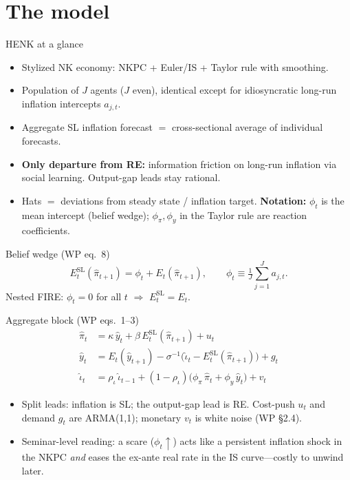 \documentclass[11pt,aspectratio=169]{beamer}
\newcommand{\Esl}{E_t^{\mathrm{SL}}}
\newcommand{\Ere}{E_t}
\begin{document}
\section{The model}
\begin{frame}{HENK at a glance}
  \begin{itemize}
    \item Stylized NK economy: NKPC + Euler/IS + Taylor rule with smoothing.
    \item Population of $J$ agents ($J$ even), identical except for idiosyncratic
          long-run inflation intercepts $a_{j,t}$.
    \item Aggregate SL inflation forecast $=$ cross-sectional average of
          individual forecasts.
    \item \textbf{Only departure from RE:} information friction on long-run
          inflation via social learning. Output-gap leads stay rational.
    \item Hats $=$ deviations from steady state / inflation target.
          \textbf{Notation:} $\phi_t$ is the mean intercept (belief wedge);
          $\phi_\pi,\phi_y$ in the Taylor rule are reaction coefficients.
  \end{itemize}
  \vfill
  \begin{block}{Belief wedge (WP eq.\ 8)}
    \[
      \Esl(\hat\pi_{t+1})
      = \phi_t + \Ere(\hat\pi_{t+1}),
      \qquad
      \phi_t \equiv \tfrac1J\sum_{j=1}^J a_{j,t}.
    \]
    Nested FIRE: $\phi_t=0$ for all $t$ $\Rightarrow$ $\Esl=\Ere$.
  \end{block}
\end{frame}

\begin{frame}{Aggregate block (WP eqs.\ 1--3)}
  \begin{align}
    \hat\pi_t
      &= \kappa\,\hat y_t
         + \beta\,\Esl(\hat\pi_{t+1})
         + u_t
      \tag{NKPC} \\[0.4em]
    \hat y_t
      &= \Ere(\hat y_{t+1})
         - \sigma^{-1}\bigl(
             \hat\iota_t - \Esl(\hat\pi_{t+1})
           \bigr)
         + g_t
      \tag{IS} \\[0.4em]
    \hat\iota_t
      &= \rho_\iota\,\hat\iota_{t-1}
         + (1-\rho_\iota)
           \bigl(\phi_\pi\,\hat\pi_t + \phi_y\,\hat y_t\bigr)
         + v_t
      \tag{Taylor}
  \end{align}
  \begin{itemize}
    \item Split leads: inflation is SL; the output-gap lead is RE.
          Cost-push $u_t$ and demand $g_t$ are ARMA(1,1); monetary $v_t$
          is white noise (WP \S2.4).
    \item Seminar-level reading: a scare ($\phi_t\uparrow$) acts like a
          persistent inflation shock in the NKPC \emph{and} eases the
          ex-ante real rate in the IS curve---costly to unwind later.
  \end{itemize}
\end{frame}
\end{document}
